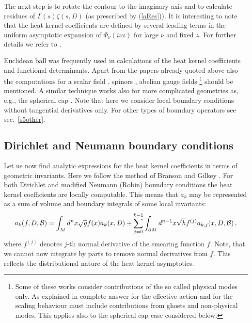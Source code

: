 The next step is to rotate the contour to the imaginary axis and
to calculate residues of $\Gamma (s)\zeta (s,D)$ (as prescribed
by (\ref{aRes})). It is interesting to note that the heat kernel
coefficients are defined by several leading terms in the uniform
asymptotic expansion of $\Phi_\nu (i\nu z)$ for large $\nu$ and
fixed $z$. For further details we refer to  \cite{Bordag:1996gm}.

Euclidean ball was frequently used in calculations of the heat kernel
coefficients and functional determinants. Apart from the papers
already quoted above also the computations for a scalar field 
\cite{Dowker:1995sp,Bordag:1996zc,Dowker:1996bh,
Bordag:1997ma,Nesterenko:1999bb}, spinors 
\cite{D'Eath:1991td,Kamenshchik:1993vj,Kamenshchik:1994tw,Dowker:1996ny,Dowker:1996sw,Kirsten:1996sy,Elizalde:1998hx,Esposito:2002vz},
abelian gauge fields 
\cite{Louko:1988ay,Esposito:1994bv,Esposito:1994xe,Vassilevich:1995we,Vassilevich:1995zn,Dowker:1996ny,Kirsten:1996sy,Esposito:1996hu,Esposito:1996gw,Elizalde:1997zw,Esposito:2000dy,Bernasconi:2003}\footnote{Some of these works consider contributions of the
so called physical modes only. As explained in \cite{Vassilevich:1995cz}
complete answer for the effective action and for the scaling behaviour
must include contributions from ghosts and non-physical modes. This
applies also to the spherical cap case considered below.}
should be mentioned.
A similar technique works also for more complicated
geometries as, e.g., the spherical cap 
\cite{Barvinsky:1992tr,Kamenshchik:1992gz,Barvinsky:1992dz,Kamenshchik:1993vj,
Dowker:1995sp}.
Note that here we consider local boundary conditions without tangential
derivatives only. For other types of boundary operators see sec.\
\ref{s5other}.
\subsection{Dirichlet and Neumann boundary conditions}\label{s5DN}
Let us now find analytic expressions for the heat kernel coefficients
in terms of geometric invariants. Here we follow the method of
Branson and Gilkey \cite{Branson:1990a,Gilkey:1995}. For both 
Dirichlet and modified Neumann (Robin) boundary conditions the
heat kernel coefficients are locally computable. This means
that $a_k$ may be represented as a sum of volume and boundary
integrals of some local invariants:
\begin{equation}
a_k(f,D,\mathcal{B})=\int_M d^nx\sqrt{g} f(x) a_k(x,D)
+\sum_{j=0}^{k-1} \int_{\partial M} d^{n-1}x\sqrt{h} f^{(j)} a_{k,j}(x,D,\mathcal{B})\,,
\label{akb-loc}
\end{equation}
where $f^{(j)}$ denotes $j$-th normal derivative of the smearing
function $f$. Note, that we cannot now integrate by parts to remove
normal derivatives from $f$. This reflects the distributional nature
of the heat kernel asymptotics.

